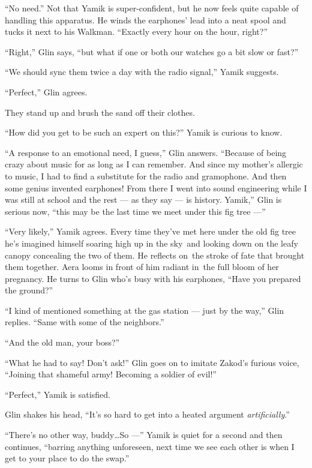 \documentclass[twoside,11pt,openany]{book}
\begin{document}
``No need.'' Not that Yamik is super-confident, but he now feels quite capable of handling
this apparatus. He winds the earphones{'} lead into a neat spool and tucks it next to his Walkman. ``Exactly
every hour on the hour, right?''

``Right,'' Glin says, ``but what if one or both our watches go a bit slow or
fast?''

``We should sync them twice a day with the radio signal,'' Yamik suggests.

``Perfect,'' Glin agrees.

They stand up and brush the sand off their clothes.

``How did you get to be such an expert on this?''  Yamik is curious to know.

``A response to an emotional need, I guess,'' Glin answers. ``Because of being
crazy about music for as long as I can remember. And since my mother's allergic to music, I had to find a substitute for
the radio and gramophone. And then some genius invented earphones! From there I went into sound engineering while I was
still at school and the rest --- as they say --- is history. Yamik,'' Glin is serious now, ``this
may be the last time we meet under this fig tree ---''

``Very likely,'' Yamik agrees. Every time they've met here under the old fig tree he's
imagined himself soaring high up in the sky~and looking down on the leafy canopy concealing the two of them. He
reflects on~the stroke of fate that brought them together.  Aera looms in front of him radiant in~the full bloom of
her pregnancy. He turns to Glin who's busy with his earphones, ``Have you prepared the
ground?''

``I kind of mentioned something at the gas station --- just by the way,'' Glin replies.
``Same with some of the neighbors.''

``And the old man, your boss?''

``What he had to say! Don't ask!'' Glin goes on to imitate Zakod's furious voice,
``Joining that shameful army! Becoming a soldier of evil!''

``Perfect,'' Yamik is satisfied.

Glin shakes his head, ``It's so hard to get into a heated argument \textit{artificially}.''

``There's no other way, buddy{\ldots}So ---'' Yamik is quiet for a second and then continues,
``barring anything unforeseen, next time we see each other is when I get to your place to do the
swap.''
\end{document}
